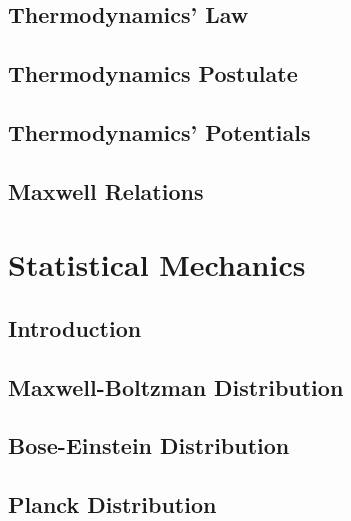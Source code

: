 \documentclass[10pt]{report}
\begin{document}
\section*{Thermodynamics' Law}
\clearpage

\section*{Thermodynamics Postulate}
\clearpage

\section*{Thermodynamics' Potentials}
\clearpage

\section*{Maxwell Relations}
\clearpage

\chapter*{Statistical Mechanics}

\section*{Introduction}
\clearpage

\section*{Maxwell-Boltzman Distribution}
\clearpage
\clearpage

\section*{Bose-Einstein Distribution}
\clearpage

\section*{Planck Distribution}
\clearpage
\end{document}
